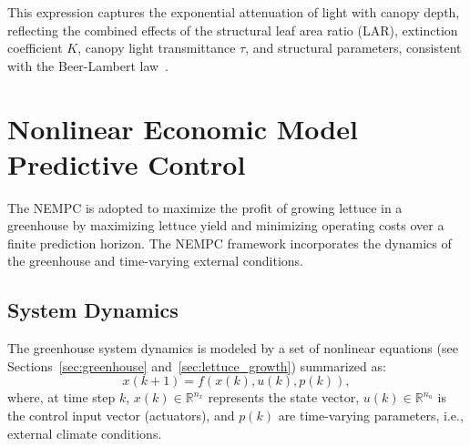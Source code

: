 \documentclass[conference]{IEEEtran}
\newcommand{\ui}[2]{#1_{\mathrm{#2}}}
\newcommand{\coo}{\ensuremath{\mathrm{CO_2}}}
\begin{document}
 This expression captures the exponential attenuation of light with canopy depth, reflecting the combined effects of the structural leaf area ratio (LAR), extinction coefficient \(K\), canopy light transmittance \( \tau \), and structural parameters, consistent with the Beer-Lambert law~\cite{Beer-Lambert}.









\section{Nonlinear Economic Model Predictive Control}\label{sec:mpc}
The NEMPC is adopted to maximize the profit of growing lettuce in a greenhouse by maximizing lettuce yield and minimizing operating costs over a finite prediction horizon. The NEMPC framework incorporates the dynamics of the greenhouse and time-varying external conditions.

\subsection{System Dynamics}\label{subsec:mpc_dynamics}
The greenhouse system dynamics is modeled by a set of nonlinear equations (see Sections~\ref{sec:greenhouse} and~\ref{sec:lettuce_growth}) summarized as:
\begin{equation}
    x(k+1) = f\left( x(k), u(k), p(k) \right),
\end{equation}
where, at time step \(k\), \(x(k) \in \mathbb{R}^{n_x}\) represents the state vector, \(u(k) \in \mathbb{R}^{n_u}\) is the control input vector (actuators), and \(p(k)\) are time-varying parameters, i.e., external climate conditions.
\end{document}
